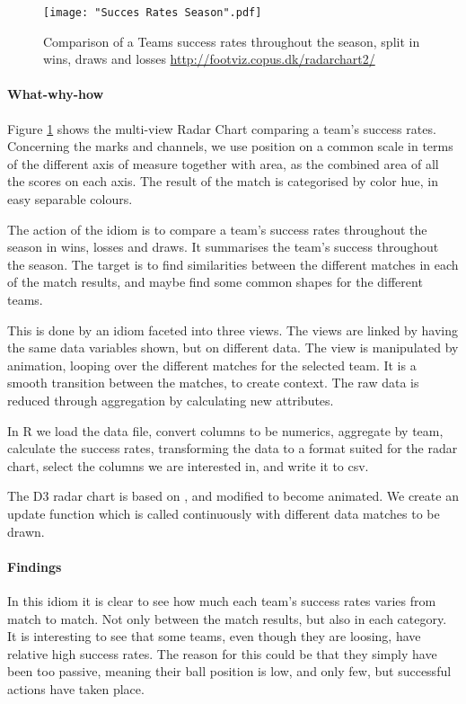\documentclass[Report.tex]{subfiles}
\begin{document}
\begin{figure}
\center
\texttt{[image: "Succes Rates Season".pdf]}
\caption{Comparison of a Teams success rates throughout the season, split in wins, draws and losses \url{http://footviz.copus.dk/radarchart2/}}
\label{Fig:CC}
\end{figure}

\paragraph{What-why-how\\}
Figure \ref{Fig:CC} shows the multi-view Radar Chart comparing a team's success rates. Concerning the marks and channels, we use position on a common scale in terms of the different axis of measure together with area, as the combined area of all the scores on each axis. The result of the match is categorised by color hue, in easy separable colours.  

The action of the idiom is to compare a team's success rates throughout the season in wins, losses and draws. It summarises the team's success throughout the season.
The target is to find similarities between the different matches in each of the match results, and maybe find some common shapes for the different teams.

This is done by an idiom faceted into three views. The views are linked by having the same data variables shown, but on different data. The view is manipulated by animation, looping over the different matches for the selected team. It is a smooth transition between the matches, to create context. The raw data is reduced through aggregation by calculating new attributes.

In R we load the data file, convert columns to be numerics, aggregate by team, calculate the success rates, transforming the data to a format suited for the radar chart, select the columns we are interested in, and write it to csv.

The D3 radar chart is based on \cite{Radar}, and modified to become animated. We create an update function which is called continuously with different data matches to be drawn. 

\paragraph{Findings\\}
In this idiom it is clear to see how much each team's success rates varies from match to match. Not only between the match results, but also in each category. It is interesting to see that some teams, even though they are loosing, have relative high success rates. The reason for this could be that they simply have been too passive, meaning their ball position is low, and only few, but successful actions have taken place.
\end{document}
